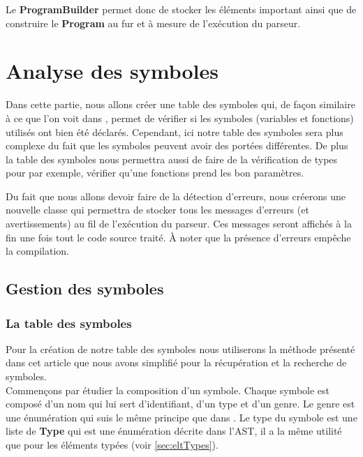 \documentclass[a4paper]{article}%
\begin{document}
Le \textbf{ProgramBuilder} permet donc de stocker les éléments important ainsi
que de construire le \textbf{Program} au fur et à mesure de l'exécution du
parseur.


\section{Analyse des symboles}

Dans cette partie, nous allons créer une table des symboles qui, de façon
similaire à ce que l'on voit dans \cite{compilerFlexBison}, permet de vérifier
si les symboles (variables et fonctions) utilisés ont bien été déclarés.
Cependant, ici notre table des symboles sera plus complexe du fait que les
symboles peuvent avoir des portées différentes. De plus la table des symboles
nous permettra aussi de faire de la vérification de types pour par exemple,
vérifier qu'une fonctions prend les bon paramètres.

Du fait que nous allons devoir faire de la détection d'erreurs, nous créerons
une nouvelle classe qui permettra de stocker tous les messages d'erreurs (et
avertissements) au fil de l'exécution du parseur. Ces messages seront affichés à
la fin une fois tout le code source traité. À noter que la présence d'erreurs
empêche la compilation.

\subsection{Gestion des symboles}

\subsubsection*{La table des symboles}

Pour la création de notre table des symboles nous utiliserons la méthode
présenté dans cet article \cite{power2000symbol} que nous avons simplifié pour
la récupération et la recherche de symboles.\\

Commençons par étudier la composition d'un symbole. Chaque symbole est composé
d'un nom qui lui sert d'identifiant, d'un type et d'un genre. Le genre est une
énumération qui suis le même principe que dans \cite{power2000symbol}. Le type
du symbole est une liste de \textbf{Type} qui est une énumération décrite dans
l'AST, il a la même utilité que pour les éléments typées (voir \ref{sec:eltTypes}).
\end{document}
